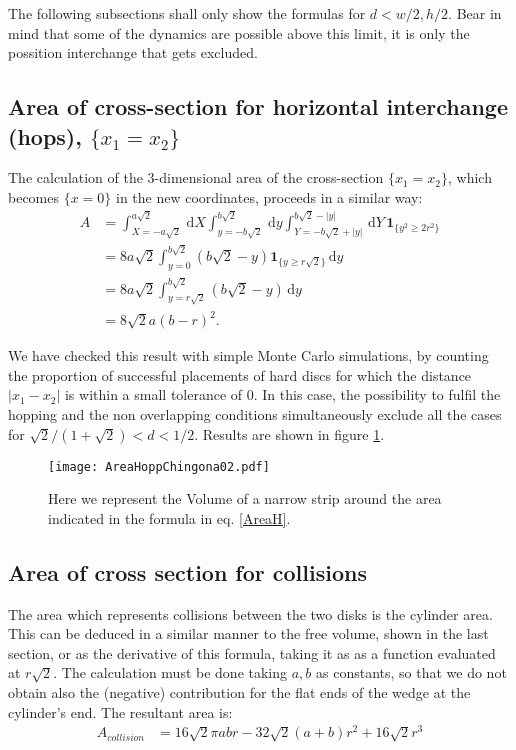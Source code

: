 \documentclass[a4paper,10pt, jcp, aps, preprint]{revtex4-1}
\newcommand{\rd}{\, \mathrm{d}}
\newcommand{\indicator}[1]{\mathbf{1}_{ \{   #1 \} } }
\begin{document}
The following subsections shall only show the formulas for $d<w/2, h/2$.
Bear in mind that some of the dynamics are possible above this limit,
it is only the possition interchange that gets excluded. 

\subsection{Area of cross-section for horizontal interchange (hops), 
$\{x_1 = x_2\}$}

The calculation of the $3$-dimensional area of the cross-section 
$\{x_1 = x_2\}$, which becomes 
$\{ x=0 \}$ in the new coordinates, proceeds in a similar way:
\begin{align}
 A &= \int_{X=-a \sqrt{2} }^{a \sqrt{2}}  \rd X
 \int_{y=-b \sqrt{2}}^{b \sqrt{2}} \rd y
\int_{Y=-b \sqrt{2} + |y| }^{b \sqrt{2}-|y|}  \rd Y
\, \indicator{y^2 \ge 2r^2 } \\
&= 8 a \sqrt{2} \int_{y=0}^{b \sqrt{2}} 
\left( b \sqrt{2} - y \right)  \indicator{y \ge r \sqrt{2} }  \rd y \\
&= 8 a \sqrt{2} \int_{y= r\sqrt{2}}^{b \sqrt{2}}  \left( b \sqrt{2} - y \right)  \rd y \\
&= 8 \sqrt{2} a ( b - r )^2. \label{AreaH}
\end{align}

We have checked this result with simple Monte Carlo simulations, 
by counting the proportion of successful placements of hard discs for which the distance 
$|x_1 - x_2|$ is within a small tolerance of $0$. In this case, the possibility to fulfil
the hopping and the non overlapping conditions simultaneously exclude 
all the cases for $\sqrt{2}/(1+\sqrt{2}) <d<1/2$. Results are shown in figure \ref{AreaHopp01}.

\begin{figure}[h]
\centering
\texttt{[image: AreaHoppChingona02.pdf]}
\caption{Here we represent the Volume of a narrow strip around the area
  indicated in the formula in eq. \ref{AreaH}.} 
\label{AreaHopp01}
\end{figure}


\subsection{Area of cross section for collisions}

The area which represents collisions between the two disks is the cylinder area. 
This can be deduced in a similar manner to the free volume, shown in the last
section, or as the derivative of this formula, taking it as as a function evaluated at 
$r\sqrt{2}$. The calculation must be done taking $a,b$ as constants, so that
we do not obtain also the (negative) contribution for the flat ends of
the wedge at the cylinder's end. The resultant area is:
\begin{align}\label{AreaChoque}
A_{collision} & =  16\sqrt{2}\pi a b r -32\sqrt{2} (a+b)r^2 +16\sqrt{2} r^3 
\end{align}
\end{document}
